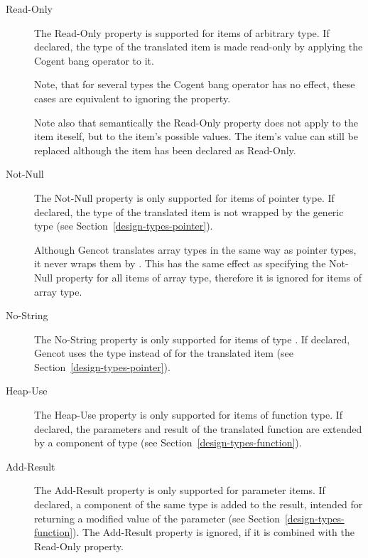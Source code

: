\begin{description}
\item[Read-Only]

The Read-Only property is supported for items of arbitrary type. If declared, the type of the translated item is
made read-only by applying the Cogent bang operator \code{!} to it.

Note, that for several types the Cogent bang operator has no effect, these cases are equivalent
to ignoring the property.

Note also that semantically the Read-Only property does not apply to the item iteself, but to the item's possible values.
The item's value can still be replaced although the item has been declared as Read-Only.

\item[Not-Null]

The Not-Null property is only supported for items of pointer type. If declared, the type of the translated item
is not wrapped by the generic  type (see Section~\ref{design-types-pointer}). 

Although Gencot translates array types in the same way as pointer types, it never wraps them by .
This has the same effect as specifying the Not-Null property for all items of array type, therefore it is ignored
for items of array type.

\item[No-String]

The No-String property is only supported for items of type . If declared, Gencot uses the  
type  instead of  for the translated item (see Section~\ref{design-types-pointer}).

\item[Heap-Use]

The Heap-Use property is only supported for items of function type. If declared, the parameters and
result of the translated function are extended by a component of type  (see Section~\ref{design-types-function}).

\item[Add-Result]

The Add-Result property is only supported for parameter items. If declared, a component of the same type
is added to the result, intended for returning a modified value of the parameter (see Section~\ref{design-types-function}). 
The Add-Result property is ignored, if it is combined with the Read-Only property.


\end{description}
